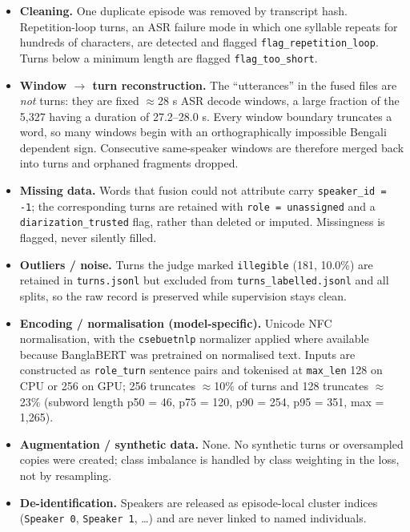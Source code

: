 \documentclass[11pt,a4paper]{article}
\begin{document}
\begin{itemize}[leftmargin=1.4em,itemsep=3pt,topsep=2pt]
  \item \textbf{Cleaning.} One duplicate episode was removed by transcript hash. Repetition-loop
        turns, an ASR failure mode in which one syllable repeats for hundreds of characters,
        are detected and flagged \texttt{flag\_repetition\_loop}. Turns below a minimum length are
        flagged \texttt{flag\_too\_short}.
  \item \textbf{Window $\rightarrow$ turn reconstruction.} The ``utterances'' in the fused files
        are \emph{not} turns: they are fixed $\approx$28 s ASR decode windows, a large fraction of
        the 5{,}327 having a duration of 27.2--28.0 s. Every window boundary truncates a word, so
        many windows begin with an orthographically impossible Bengali dependent sign. Consecutive
        same-speaker windows are therefore merged back into turns and orphaned fragments dropped.
  \item \textbf{Missing data.} Words that fusion could not attribute carry
        \texttt{speaker\_id = -1}; the corresponding turns are retained with
        \texttt{role = unassigned} and a \texttt{diarization\_trusted} flag, rather than deleted or
        imputed. Missingness is flagged, never silently filled.
  \item \textbf{Outliers / noise.} Turns the judge marked \texttt{illegible} (181, 10.0\%) are
        retained in \texttt{turns.jsonl} but excluded from \texttt{turns\_labelled.jsonl} and all
        splits, so the raw record is preserved while supervision stays clean.
  \item \textbf{Encoding / normalisation (model-specific).} Unicode NFC normalisation, with the
        \texttt{csebuetnlp} normalizer applied where available because BanglaBERT was pretrained
        on normalised text. Inputs are constructed as \texttt{role\_turn} sentence pairs and
        tokenised at \texttt{max\_len} 128 on CPU or 256 on GPU; 256 truncates $\approx$10\% of
        turns and 128 truncates $\approx$23\% (subword length p50 = 46, p75 = 120, p90 = 254,
        p95 = 351, max = 1{,}265).
  \item \textbf{Augmentation / synthetic data.} None. No synthetic turns or oversampled copies were
        created; class imbalance is handled by class weighting in the loss, not by resampling.
  \item \textbf{De-identification.} Speakers are released as episode-local cluster indices
        (\texttt{Speaker 0}, \texttt{Speaker 1}, \dots) and are never linked to named individuals.

\end{itemize}
\end{document}
